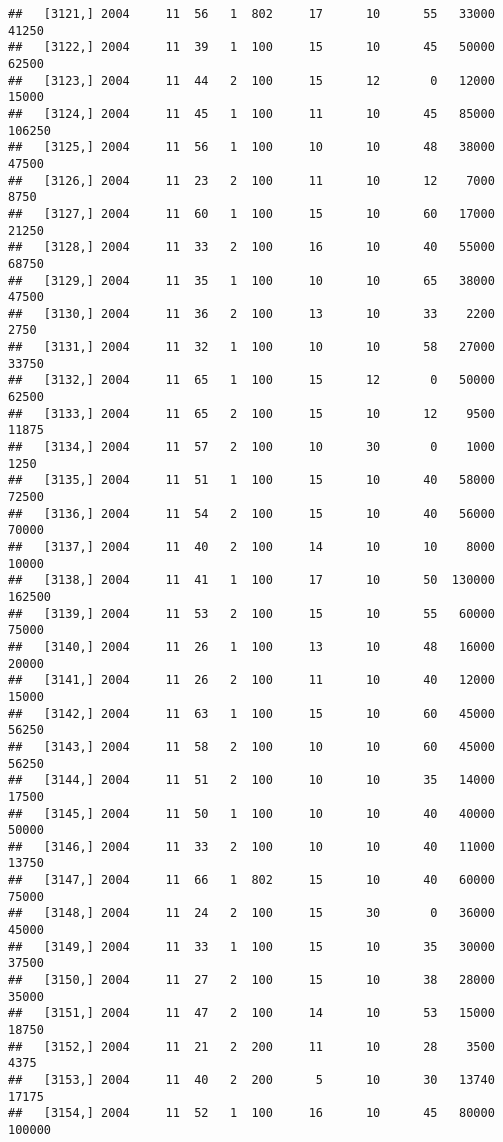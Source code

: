 \documentclass{article}\usepackage[]{graphicx}\usepackage[]{color}
\makeatletter
\newenvironment{kframe}{%
 \def\at@end@of@kframe{}%
 \ifinner\ifhmode%
  \def\at@end@of@kframe{\end{minipage}}%
  \begin{minipage}{\columnwidth}%
 \fi\fi%
 \def\FrameCommand##1{\hskip\@totalleftmargin \hskip-\fboxsep
 \colorbox{shadecolor}{##1}\hskip-\fboxsep
     \hskip-\linewidth \hskip-\@totalleftmargin \hskip\columnwidth}%
 \MakeFramed {\advance\hsize-\width
   \@totalleftmargin\z@ \linewidth\hsize
   \@setminipage}}%
 {\par\unskip\endMakeFramed%
 \at@end@of@kframe}
\newenvironment{knitrout}{}{} %
\makeatother
\begin{document}
\begin{knitrout}
\begin{kframe}
\begin{verbatim}
##   [3121,] 2004     11  56   1  802     17      10      55   33000   41250
##   [3122,] 2004     11  39   1  100     15      10      45   50000   62500
##   [3123,] 2004     11  44   2  100     15      12       0   12000   15000
##   [3124,] 2004     11  45   1  100     11      10      45   85000  106250
##   [3125,] 2004     11  56   1  100     10      10      48   38000   47500
##   [3126,] 2004     11  23   2  100     11      10      12    7000    8750
##   [3127,] 2004     11  60   1  100     15      10      60   17000   21250
##   [3128,] 2004     11  33   2  100     16      10      40   55000   68750
##   [3129,] 2004     11  35   1  100     10      10      65   38000   47500
##   [3130,] 2004     11  36   2  100     13      10      33    2200    2750
##   [3131,] 2004     11  32   1  100     10      10      58   27000   33750
##   [3132,] 2004     11  65   1  100     15      12       0   50000   62500
##   [3133,] 2004     11  65   2  100     15      10      12    9500   11875
##   [3134,] 2004     11  57   2  100     10      30       0    1000    1250
##   [3135,] 2004     11  51   1  100     15      10      40   58000   72500
##   [3136,] 2004     11  54   2  100     15      10      40   56000   70000
##   [3137,] 2004     11  40   2  100     14      10      10    8000   10000
##   [3138,] 2004     11  41   1  100     17      10      50  130000  162500
##   [3139,] 2004     11  53   2  100     15      10      55   60000   75000
##   [3140,] 2004     11  26   1  100     13      10      48   16000   20000
##   [3141,] 2004     11  26   2  100     11      10      40   12000   15000
##   [3142,] 2004     11  63   1  100     15      10      60   45000   56250
##   [3143,] 2004     11  58   2  100     10      10      60   45000   56250
##   [3144,] 2004     11  51   2  100     10      10      35   14000   17500
##   [3145,] 2004     11  50   1  100     10      10      40   40000   50000
##   [3146,] 2004     11  33   2  100     10      10      40   11000   13750
##   [3147,] 2004     11  66   1  802     15      10      40   60000   75000
##   [3148,] 2004     11  24   2  100     15      30       0   36000   45000
##   [3149,] 2004     11  33   1  100     15      10      35   30000   37500
##   [3150,] 2004     11  27   2  100     15      10      38   28000   35000
##   [3151,] 2004     11  47   2  100     14      10      53   15000   18750
##   [3152,] 2004     11  21   2  200     11      10      28    3500    4375
##   [3153,] 2004     11  40   2  200      5      10      30   13740   17175
##   [3154,] 2004     11  52   1  100     16      10      45   80000  100000

\end{verbatim}
\end{kframe}
\end{knitrout}
\end{document}
